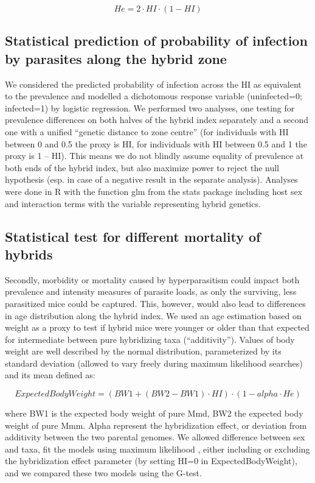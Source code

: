 \begin{equation}
He=2 · HI · (1 − HI)
\end{equation}

\subsection{Statistical prediction of probability of infection by parasites along the hybrid zone}
We considered the predicted probability of infection across the HI as equivalent to the prevalence and modelled a dichotomous response variable (uninfected=0; infected=1) by logistic regression. We performed two analyses, one testing for prevalence differences on both halves of the hybrid index separately and a second one with a unified “genetic distance to zone centre” (for individuals with HI between 0 and 0.5 the proxy is HI, for individuals with HI between 0.5 and 1 the proxy is 1 – HI). This means we do not blindly assume equality of prevalence at both ends of the hybrid index, but also maximize power to reject the null hypothesis (esp. in case of a negative result in the separate analysis). Analyses were done in R with the function glm from the stats package \citep{R_2010} including host sex and interaction terms with the variable representing hybrid genetics.

\subsection{Statistical test for different mortality of hybrids}
Secondly, morbidity or mortality caused by hyperparasitism could impact both prevalence and intensity measures of parasite loads, as only the surviving, less parasitized mice could be captured. This, however, would also lead to differences in age distribution along the hybrid index. We used an age estimation based on weight \parencite[as in][]{behnke_aspiculuris_1976} as a proxy to test if hybrid mice were younger or older than that expected for intermediate between pure hybridizing taxa (“additivity”). Values of body weight are well described by the normal distribution, parameterized by its standard deviation (allowed to vary freely during maximum likelihood searches) and its mean defined as:

\begin{equation}
ExpectedBodyWeight=(BW1 + (BW2 − BW1) · HI) · (1 − alpha · He)
\end{equation}

where BW1 is the expected body weight of pure Mmd, BW2 the expected body weight of pure Mmm. Alpha represent the hybridization effect, or deviation from additivity between the two parental genomes. We allowed difference between sex and taxa, fit the models using maximum likelihood \parencite[using the R package mle2;][]{bolker_bbmle_2017}, either including or excluding the hybridization effect parameter (by setting HI=0 in ExpectedBodyWeight), and we compared these two models using the G-test. 

